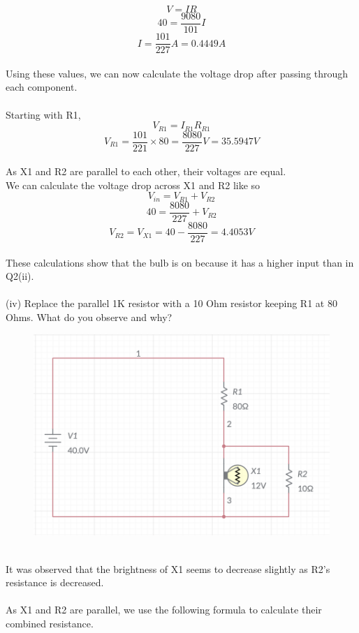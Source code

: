 \documentclass[12pt]{article}
\begin{document}
\[V = IR\]
\[40 = \frac{9080}{101}I\]
\[I = \frac{101}{227}A = 0.4449A\]\\
Using these values, we can now calculate the voltage drop after passing through each component.\\
\\
Starting with R1,\\
\[V_{R1} = I_{R1}R_{R1}\]
\[V_{R1} = \frac{101}{221} \times 80 = \frac{8080}{227}V = 35.5947V\]\\
As X1 and R2 are parallel to each other, their voltages are equal.\\
We can calculate the voltage drop across X1 and R2 like so\\
\[V_{in} = V_{R1} + V_{R2}\]
\[40 = \frac{8080}{227} + V_{R2}\]
\[V_{R2} = V_{X1} = 40 - \frac{8080}{227} = 4.4053V\]\\
These calculations show that the bulb is on because it has a higher input than in Q2(ii).\\
\\
(iv) Replace the parallel 1K resistor with a 10 Ohm resistor keeping R1 at 80 Ohms. What do you observe and why?\\
\begin{figure}[!h] 
	\begin{centering}
		\includegraphics[keepaspectratio = true, width = 5in]{Q2(iv).png}
	\end{centering}
\end{figure}\\
It was observed that the brightness of X1 seems to decrease slightly as R2's resistance is decreased.\\
\\
As X1 and R2 are parallel, we use the following formula to calculate their combined resistance.\\
\end{document}
